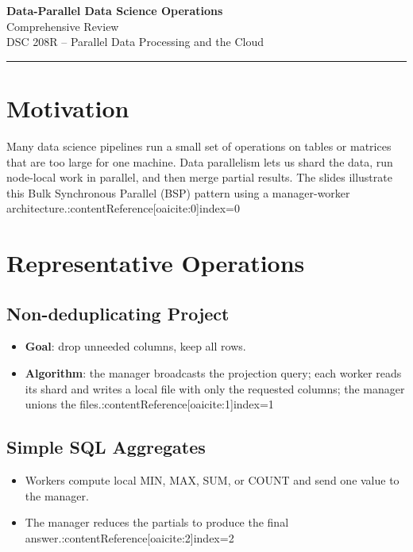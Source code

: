 \documentclass[11pt]{article}
\begin{document}
\begin{center}
  {\LARGE\bfseries Data-Parallel Data Science Operations}\\[2mm]
  {\large Comprehensive Review}\\[1mm]
  {\normalsize DSC 208R -- Parallel Data Processing and the Cloud}
\end{center}
\vspace{-0.6em}\hrule\vspace{0.9em}

\tableofcontents
\newpage

\section{Motivation}

Many data science pipelines run a small set of operations on tables or matrices that are too large for one machine.  Data parallelism lets us shard the data, run node-local work in parallel, and then merge partial results.  The slides illustrate this Bulk Synchronous Parallel (BSP) pattern using a manager-worker architecture.:contentReference[oaicite:0]{index=0}

\section{Representative Operations}

\subsection{Non-deduplicating Project}

\begin{itemize}[itemsep=0pt]
  \item \textbf{Goal}: drop unneeded columns, keep all rows.
  \item \textbf{Algorithm}: the manager broadcasts the projection query; each worker reads its shard and writes a local file with only the requested columns; the manager unions the files.:contentReference[oaicite:1]{index=1}
\end{itemize}

\subsection{Simple SQL Aggregates}

\begin{itemize}[itemsep=0pt]
  \item Workers compute local MIN, MAX, SUM, or COUNT and send one value to the manager.
  \item The manager reduces the partials to produce the final answer.:contentReference[oaicite:2]{index=2}
\end{itemize}
\end{document}

